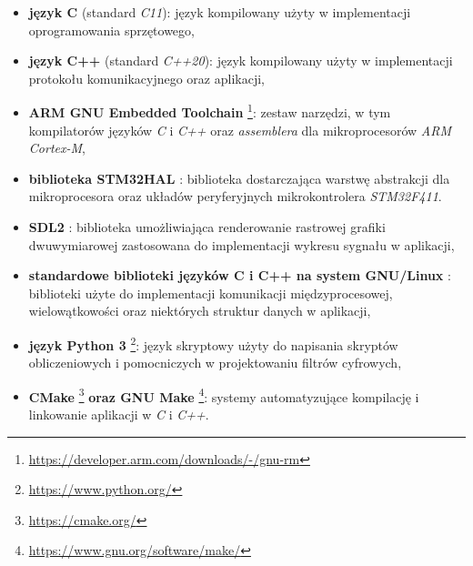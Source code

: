\begin{itemize}

    \item \textbf{język C} (standard \textit{C11}): język kompilowany użyty w implementacji oprogramowania sprzętowego,

    \item \textbf{język C++} (standard \textit{C++20}): język kompilowany użyty w implementacji 
    protokołu komunikacyjnego oraz aplikacji,

    \item \textbf{ARM GNU Embedded Toolchain} \footnote{\url{https://developer.arm.com/downloads/-/gnu-rm}}: zestaw narzędzi, w tym
    kompilatorów języków \textit{C} i \textit{C++} oraz \textit{assemblera} dla mikroprocesorów \textit{ARM Cortex-M},

    \item \textbf{biblioteka STM32HAL} \cite{STM32HAL}: biblioteka dostarczająca warstwę abstrakcji dla mikroprocesora 
    oraz układów peryferyjnych mikrokontrolera \textit{STM32F411}.

    \item \textbf{SDL2} \cite{SDL2}: biblioteka umożliwiająca renderowanie rastrowej grafiki dwuwymiarowej zastosowana
    do implementacji wykresu sygnału w aplikacji,

    \item \textbf{standardowe biblioteki języków C i C++ na system GNU/Linux} \cite{GLIBC238}: biblioteki użyte do 
    implementacji komunikacji międzyprocesowej, wielowątkowości oraz niektórych struktur danych w aplikacji,

    \item \textbf{język Python 3} \footnote{\url{https://www.python.org/}}: język skryptowy użyty do napisania 
    skryptów obliczeniowych i pomocniczych w projektowaniu filtrów cyfrowych,
   
    \item \textbf{CMake} \footnote{\url{https://cmake.org/}} \textbf{oraz GNU Make} 
    \footnote{\url{https://www.gnu.org/software/make/}}: systemy automatyzujące 
    kompilację i linkowanie aplikacji w \textit{C} i \textit{C++}.

\end{itemize}

